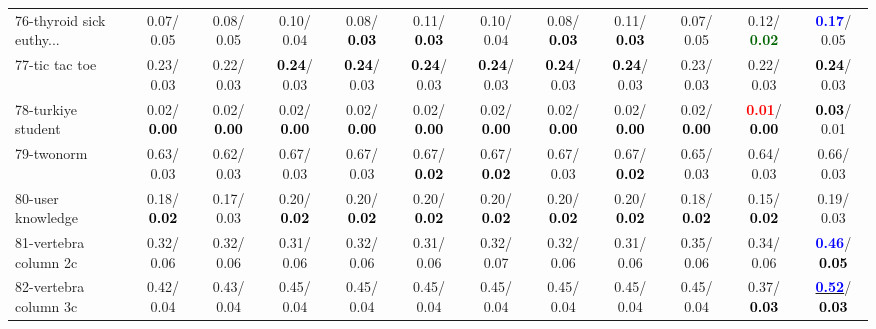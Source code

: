 \begin{table}[h]
\begin{center}
{\begin{tabular}{lc|c|c|c|c|c|c|c|c|c|c}
76-thyroid sick euthy... &   0.07/  0.05 &   0.08/  0.05 &   0.10/  0.04 &   0.08/\textcolor{black}{\textbf{  0.03}} &   0.11/\textcolor{black}{\textbf{  0.03}} &   0.10/  0.04 &   0.08/\textcolor{black}{\textbf{  0.03}} &   0.11/\textcolor{black}{\textbf{  0.03}} &   0.07/  0.05 &   0.12/\textcolor{darkgreen}{\textbf{  0.02}} & \textcolor{blue}{\textbf{  0.17}}/  0.05 \\
77-tic tac toe &   0.23/  0.03 &   0.22/  0.03 & \textcolor{black}{\textbf{  0.24}}/  0.03 & \textcolor{black}{\textbf{  0.24}}/  0.03 & \textcolor{black}{\textbf{  0.24}}/  0.03 & \textcolor{black}{\textbf{  0.24}}/  0.03 & \textcolor{black}{\textbf{  0.24}}/  0.03 & \textcolor{black}{\textbf{  0.24}}/  0.03 &   0.23/  0.03 &   0.22/  0.03 & \textcolor{black}{\textbf{  0.24}}/  0.03 \\
78-turkiye student &   0.02/\textcolor{black}{\textbf{  0.00}} &   0.02/\textcolor{black}{\textbf{  0.00}} &   0.02/\textcolor{black}{\textbf{  0.00}} &   0.02/\textcolor{black}{\textbf{  0.00}} &   0.02/\textcolor{black}{\textbf{  0.00}} &   0.02/\textcolor{black}{\textbf{  0.00}} &   0.02/\textcolor{black}{\textbf{  0.00}} &   0.02/\textcolor{black}{\textbf{  0.00}} &   0.02/\textcolor{black}{\textbf{  0.00}} & \textcolor{red}{\textbf{  0.01}}/\textcolor{black}{\textbf{  0.00}} & \textcolor{black}{\textbf{  0.03}}/  0.01 \\ \hline
79-twonorm &   0.63/  0.03 &   0.62/  0.03 &   0.67/  0.03 &   0.67/  0.03 &   0.67/\textcolor{black}{\textbf{  0.02}} &   0.67/\textcolor{black}{\textbf{  0.02}} &   0.67/  0.03 &   0.67/\textcolor{black}{\textbf{  0.02}} &   0.65/  0.03 &   0.64/  0.03 &   0.66/  0.03 \\
80-user knowledge &   0.18/\textcolor{black}{\textbf{  0.02}} &   0.17/  0.03 &   0.20/\textcolor{black}{\textbf{  0.02}} &   0.20/\textcolor{black}{\textbf{  0.02}} &   0.20/\textcolor{black}{\textbf{  0.02}} &   0.20/\textcolor{black}{\textbf{  0.02}} &   0.20/\textcolor{black}{\textbf{  0.02}} &   0.20/\textcolor{black}{\textbf{  0.02}} &   0.18/\textcolor{black}{\textbf{  0.02}} &   0.15/\textcolor{black}{\textbf{  0.02}} &   0.19/  0.03 \\
81-vertebra column 2c &   0.32/  0.06 &   0.32/  0.06 &   0.31/  0.06 &   0.32/  0.06 &   0.31/  0.06 &   0.32/  0.07 &   0.32/  0.06 &   0.31/  0.06 &   0.35/  0.06 &   0.34/  0.06 & \textcolor{blue}{\textbf{  0.46}}/\textcolor{black}{\textbf{  0.05}} \\
82-vertebra column 3c &   0.42/  0.04 &   0.43/  0.04 &   0.45/  0.04 &   0.45/  0.04 &   0.45/  0.04 &   0.45/  0.04 &   0.45/  0.04 &   0.45/  0.04 &   0.45/  0.04 &   0.37/\textcolor{black}{\textbf{  0.03}} & \underline{\textcolor{blue}{\textbf{  0.52}}}/\textcolor{black}{\textbf{  0.03}} \\

\end{tabular}}
\end{center}
\end{table}
